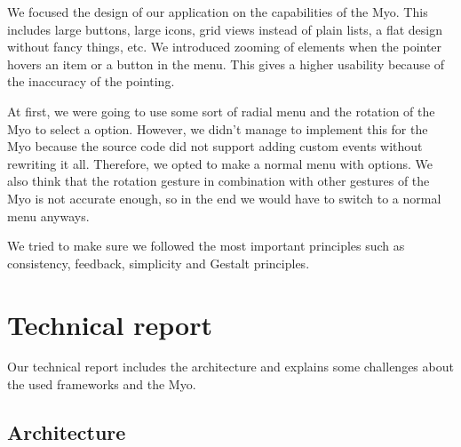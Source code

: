 \documentclass{article}
\begin{document}
We focused the design of our application on the capabilities of the Myo. This includes large buttons, large icons, grid views instead of plain lists, a flat design without fancy things, etc. We introduced zooming of elements when the pointer hovers an item or a button in the menu. This gives a higher usability because of the inaccuracy of the pointing. 

At first, we were going to use some sort of radial menu and the rotation of the Myo to select a option. However, we didn't manage to implement this for the Myo because the source code did not support adding custom events without rewriting it all. Therefore, we opted to make a normal menu with options. We also think that the rotation gesture in combination with other gestures of the Myo is not accurate enough, so in the end we would have to switch to a normal menu anyways.

We tried to make sure we followed the most important principles such as consistency, feedback, simplicity and Gestalt principles.

\section{Technical report}

Our technical report includes the architecture and explains some challenges about the used frameworks and the Myo.
\subsection{Architecture}
\end{document}
